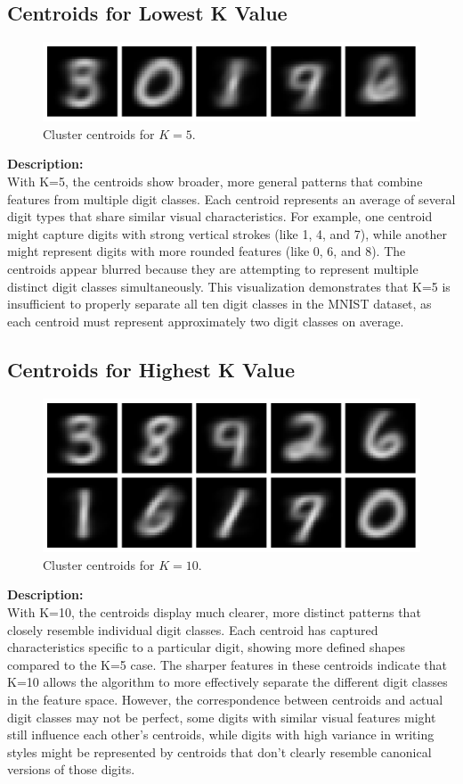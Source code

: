 \documentclass{article}
\begin{document}
\subsection*{Centroids for Lowest K Value}
\begin{figure}[ht]
    \centering
    \includegraphics[width=0.8\linewidth]{figures/centroids_k5.pdf}
    \caption{Cluster centroids for \(K = 5\).}
    \label{fig:centroids_k5}
\end{figure}
\noindent
\textbf{Description:} \\
With K=5, the centroids show broader, more general patterns that combine features from multiple digit classes. Each centroid represents an average of several digit types that share similar visual characteristics. For example, one centroid might capture digits with strong vertical strokes (like 1, 4, and 7), while another might represent digits with more rounded features (like 0, 6, and 8). The centroids appear blurred because they are attempting to represent multiple distinct digit classes simultaneously. This visualization demonstrates that K=5 is insufficient to properly separate all ten digit classes in the MNIST dataset, as each centroid must represent approximately two digit classes on average.
\vspace{1.5em}
\subsection*{Centroids for Highest K Value}
\begin{figure}[ht]
    \centering
    \includegraphics[width=0.8\linewidth]{figures/centroids_k10.pdf}
    \caption{Cluster centroids for \(K = 10\).}
    \label{fig:centroids_k10}
\end{figure}
\noindent
\textbf{Description:} \\
With K=10, the centroids display much clearer, more distinct patterns that closely resemble individual digit classes. Each centroid has captured characteristics specific to a particular digit, showing more defined shapes compared to the K=5 case. The sharper features in these centroids indicate that K=10 allows the algorithm to more effectively separate the different digit classes in the feature space. However, the correspondence between centroids and actual digit classes may not be perfect, some digits with similar visual features might still influence each other's centroids, while digits with high variance in writing styles might be represented by centroids that don't clearly resemble canonical versions of those digits.
\vspace{1.5em}
\end{document}
